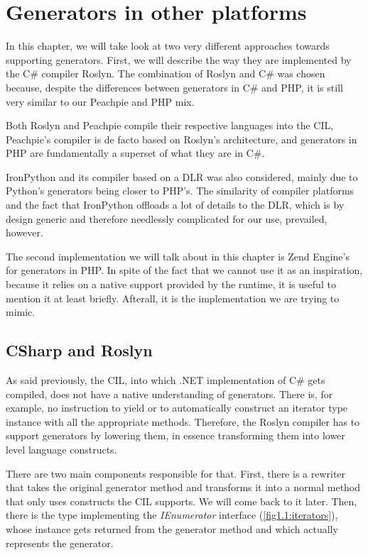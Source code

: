 \chapter{Generators in other platforms}

In this chapter, we will take look at two very different approaches towards supporting generators. First, we will describe the way they are implemented by the C\# compiler Roslyn. The combination of Roslyn and C\# was chosen because, despite the differences between generators in C\# and PHP, it is still very similar to our Peachpie and PHP mix.

Both Roslyn and Peachpie compile their respective languages into the CIL, Peachpie’s compiler is de facto based on Roslyn’s architecture, and generators in PHP are fundamentally a superset of what they are in C\#. 

IronPython and its compiler based on a DLR was also considered, mainly due to Python’s generators being closer to PHP’s. The similarity of compiler platforms and the fact that IronPython offloads a lot of details to the DLR, which is by design generic and therefore needlessly complicated for our use, prevailed, however. 

The second implementation we will talk about in this chapter is Zend Engine’s for generators in PHP. In spite of the fact that we cannot use it as an inspiration, because it relies on a native support provided by the runtime, it is useful to mention it at least briefly. Afterall, it is the implementation we are trying to mimic.

\section{CSharp and Roslyn}\label{sec:3:1}

As said previously, the CIL, into which .NET implementation of C\# gets compiled, does not have a native understanding of generators. There is, for example, no instruction to yield or to automatically construct an iterator type instance with all the appropriate methods. Therefore, the Roslyn compiler has to support generators by lowering them, in essence transforming them into lower level language constructs. 

There are two main components responsible for that. First, there is a rewriter that takes the original generator method and transforms it into a normal method that only uses constructs the CIL supports. We will come back to it later. Then, there is the type implementing the \emph{IEnumerator} interface (\autoref{fig1.1:iterators}), whose instance gets returned from the generator method and which actually represents the generator.


